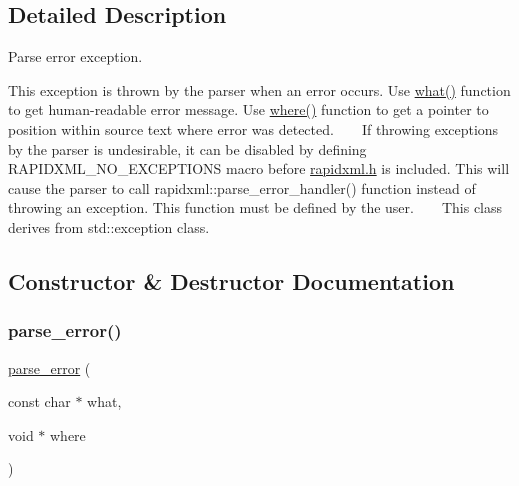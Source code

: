 \subsection{Detailed Description}
Parse error exception. 

This exception is thrown by the parser when an error occurs. Use \mbox{\hyperlink{classrapidxml_1_1parse__error_ad62489809e3df568e973597b928d6d9b}{what()}} function to get human-\/readable error message. Use \mbox{\hyperlink{classrapidxml_1_1parse__error_ad34b0f81cc71453b5b111e4afb557e1d}{where()}} function to get a pointer to position within source text where error was detected. ~\newline
~\newline
 If throwing exceptions by the parser is undesirable, it can be disabled by defining R\+A\+P\+I\+D\+X\+M\+L\+\_\+\+N\+O\+\_\+\+E\+X\+C\+E\+P\+T\+I\+O\+NS macro before \mbox{\hyperlink{rapidxml_8h_source}{rapidxml.\+h}} is included. This will cause the parser to call rapidxml\+::parse\+\_\+error\+\_\+handler() function instead of throwing an exception. This function must be defined by the user. ~\newline
~\newline
 This class derives from {\ttfamily std\+::exception} class. 

\subsection{Constructor \& Destructor Documentation}
\mbox{\label{classrapidxml_1_1parse__error_a4dd8d1bdbd9221df4dcb90cafaee3332}} 
\subsubsection{\texorpdfstring{parse\+\_\+error()}{parse\_error()}}
{\footnotesize\ttfamily \mbox{\hyperlink{classrapidxml_1_1parse__error}{parse\+\_\+error}} (\begin{DoxyParamCaption}\item[{const char $\ast$}]{what,  }\item[{void $\ast$}]{where }\end{DoxyParamCaption})\hspace{0.3cm}{\ttfamily [inline]}}



